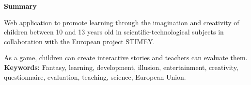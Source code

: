 \newpage{\pagestyle{empty}\cleardoublepage} 
\vspace*{\fill}
\begin{center}
	\textbf{Summary}
\end{center}
Web application to promote learning through the imagination and creativity of children between 10 and 13 years old in scientific-technological subjects in collaboration with the European project STIMEY.

As a game, children can create interactive stories and teachers can evaluate them.\\

\textbf{Keywords:}
Fantasy, learning, development, illusion, entertainment, creativity, questionnaire, evaluation, teaching, science, European Union.
\vspace*{\fill}

\newpage

